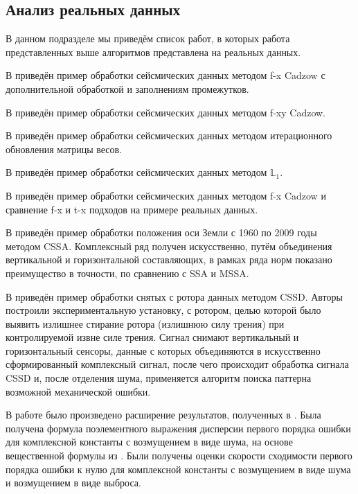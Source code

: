 \documentclass[specialist,
               substylefile = spbu.rtx,
               subf,href,colorlinks=true, 12pt]{disser}
\begin{document}
\subsection{Анализ реальных данных}
\label{sub:realdata}
В данном подразделе мы приведём список работ, в которых работа представленных выше алгоритмов представлена на реальных данных.

В \cite{RajeshTiwari} приведён пример обработки сейсмических данных методом f-x Cadzow с дополнительной обработкой и заполнениям промежутков.

В \cite{Trickett2008} приведён пример обработки сейсмических данных методом f-xy Cadzow.

В \cite{Chen} приведён пример обработки сейсмических данных методом итерационного обновления матрицы весов.

В \cite{Galbraith.etal15} приведён пример обработки сейсмических данных методом $\mathbb{L}_1$.

В \cite{YuanWang11} приведён пример обработки сейсмических данных методом f-x Cadzow и сравнение f-x и t-x подходов на примере реальных данных.

В \cite{Li18} приведён пример обработки положения оси Земли с 1960 по 2009 годы методом CSSA. Комплексный ряд получен искусственно, путём объединения вертикальной и горизонтальной составляющих, в рамках ряда норм показано преимущество в точности, по сравнению с SSA и MSSA.

В \cite{Pang.etal19} приведён пример обработки снятых с ротора данных методом CSSD. Авторы построили экспериментальную установку, с ротором, целью которой было выявить излишнее стирание ротора (излишнюю силу трения) при контролируемой извне силе  трения. Сигнал снимают вертикальный и горизонтальный сенсоры, данные с которых объединяются в искусственно сформированный комплексный сигнал, после чего происходит обработка сигнала CSSD и, после отделения шума, применяется алгоритм поиска паттерна возможной механической ошибки.



\conclusion
В работе было произведено расширение результатов, полученных в \cite{SenBach}. Была получена формула поэлементного выражения дисперсии первого порядка ошибки для комплексной константы с возмущением в виде шума, на основе вещественной формулы из \cite{Vlas2008}. Были получены оценки скорости сходимости первого порядка ошибки к нулю для комплексной константы с возмущением в виде шума и возмущением в виде выброса.
\end{document}
